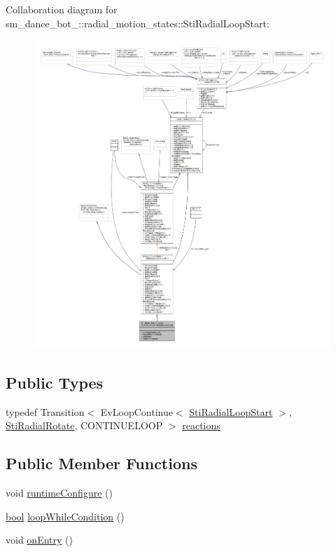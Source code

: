 Collaboration diagram for sm\+\_\+dance\+\_\+bot\+\_\+:\+:radial\+\_\+motion\+\_\+states\+:\+:Sti\+Radial\+Loop\+Start\+:
\nopagebreak
\begin{figure}[H]
\begin{center}
\leavevmode
\includegraphics[width=350pt]{structsm__dance__bot__2_1_1radial__motion__states_1_1StiRadialLoopStart__coll__graph}
\end{center}
\end{figure}
\subsection*{Public Types}
\begin{DoxyCompactItemize}
\item 
typedef Transition$<$ Ev\+Loop\+Continue$<$ \hyperlink{structsm__dance__bot__2_1_1radial__motion__states_1_1StiRadialLoopStart}{Sti\+Radial\+Loop\+Start} $>$, \hyperlink{structsm__dance__bot__2_1_1radial__motion__states_1_1StiRadialRotate}{Sti\+Radial\+Rotate}, C\+O\+N\+T\+I\+N\+U\+E\+L\+O\+OP $>$ \hyperlink{structsm__dance__bot__2_1_1radial__motion__states_1_1StiRadialLoopStart_a27957a8a39ae0f4507d93e41e6af1efc}{reactions}
\end{DoxyCompactItemize}
\subsection*{Public Member Functions}
\begin{DoxyCompactItemize}
\item 
void \hyperlink{structsm__dance__bot__2_1_1radial__motion__states_1_1StiRadialLoopStart_a511c2ae518381799867648541140ea18}{runtime\+Configure} ()
\item 
\hyperlink{classbool}{bool} \hyperlink{structsm__dance__bot__2_1_1radial__motion__states_1_1StiRadialLoopStart_a485a0dd259979291c7318b5559bc55e8}{loop\+While\+Condition} ()
\item 
void \hyperlink{structsm__dance__bot__2_1_1radial__motion__states_1_1StiRadialLoopStart_af4ffe128f3e10d37a91f1ced8d328161}{on\+Entry} ()
\end{DoxyCompactItemize}
